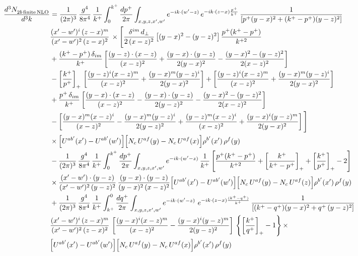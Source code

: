 \documentclass[10pt]{article}
\begin{document}
\begin{align}
    \frac{d^{3}N_{2b\,\rm finite\, NLO}^{\rm}}{d^{3}k} & = \frac{1}{(2\pi)^{3}}\,\frac{g^{4}}{8\pi^{4}}\,\frac{1}{k^{+}}\int_{0}^{k^{+}}\frac{dp^{+}}{2\pi}\int_{x,y,z,x',w'}e^{-ik\cdot(w'-z)}\,e^{-ik\cdot(z-x)\frac{p^{+}}{k^{+}}}\,\frac{1}{\left[p^{+}(y-x)^{2}+(k^{+}-p^{+})(y-z)^{2}\right]}\notag \\ & \frac{(x'-w')^{i}\,(z-x)^{m}}{(x'-w')^{2}\,(z-x)^{2}}\,\times\Bigg[\frac{\delta^{im}\,d_{\perp}}{2\,(x-z)^{2}}\left[(y-x)^{2}-(y-z)^{2}\right]\frac{p^{+}(k^{+}-p^{+})}{k^{+2}}
\notag \\ & +\frac{(k^{+}-p^{+})\,\delta_{im}}{k^{+}}\left[\frac{(y-z)\cdot(x-z)}{(x-z)^{2}}+\frac{(y-x)\cdot(y-z)}{2(y-x)^{2}}-\frac{(y-x)^{2}-(y-z)^{2}}{2(x-z)^{2}}\right]\notag\\
&-\left[\frac{k^{+}}{p^{+}}\right]_{+}\,\left[\frac{(y-z)^{i}(x-z)^{m}}{(x-z)^{2}}+\frac{(y-x)^{m}(y-z)^{i}}{2(y-x)^{2}}\right]+\left[\frac{(y-z)^{i}(x-z)^{m}}{(x-z)^{2}}+\frac{(y-x)^{m}(y-z)^{i}}{2(y-x)^{2}}\right]\notag\\
&+\frac{p^{+}\,\delta_{im}}{k^{+}}\left[\frac{(y-x)\cdot(x-z)}{(x-z)^{2}}-\frac{(y-x)\cdot(y-z)}{2(y-z)^{2}}-\frac{(y-x)^{2}-(y-z)^{2}}{2(x-z)^{2}}\right]\notag\\
&-\left[\frac{(y-x)^{m}(x-z)^{i}}{(x-z)^{2}}-\frac{(y-x)^{m}(y-z)^{i}}{2(y-z)^{2}}+\frac{(y-z)^{m}(x-z)^{i}}{(x-z)^{2}}+\frac{(y-x)^{i}(y-z)^{m}}{2(y-x)^{2}}\right]\Bigg]\notag\\
&\times\Big[U^{ab'}(x')-U^{ab'}(w')\Big]\Big[N_{c}\,U^{af}(y)-N_{c}\,U^{af}(x)\Big]\rho^{b'}(x')\,\rho^{f}(y)\notag \\
&-\frac{1}{(2\pi)^{3}}\,\frac{g^{4}}{8\pi^{4}}\,\frac{1}{k^{+}}\int_{0}^{k^{+}}\frac{dp^{+}}{2\pi}\int_{x,y,z,x',w'}e^{-ik\cdot(w'-z)}\,\frac{1}{k^{+}}\left[\frac{p^{+}(k^{+}-p^{+})}{k^{+2}}+\left[\frac{k^{+}}{k^{+}-p^{+}}\right]_{+}+\left[\frac{k^{+}}{p^{+}}\right]_{+}-2\right]\notag\\
&\times\frac{(x'-w')\cdot(y-z)}{(x'-w')^{2}\,(y-z)^{2}}\,\frac{(y-x)\cdot(y-z)}{(y-x)^{2}\,(x-z)^{2}}\Big[U^{ab'}(x')-U^{ab'}(w')\Big]\Big[N_{c}\,U^{af}(y)-N_{c}\,U^{af}(z)\Big]\rho^{b'}(x')\,\rho^{f}(y)\notag \\
& + \frac{1}{(2\pi)^{3}}\,\frac{g^{4}}{8\pi^{4}}\,\frac{1}{k^{+}}\int_{k^{+}}^{0}\frac{dq^{+}}{2\pi}\int_{x,y,z,x',w'}e^{-ik\cdot(w'-z)}\ e^{-ik\cdot(z-x)\frac{(k^{+}-q^{+})}{k^{+}}}\,\frac{1}{\left[(k^{+}-q^{+})(y-x)^{2}+q^{+}\,(y-z)^{2}\right]}\notag \\ & \frac{(x'-w')^{i}\,(z-x)^{m}}{(x'-w')^{2}\,(z-x)^{2}}\,\left[\frac{(y-x)^{i}(x-z)^{m}}{(x-z)^{2}}-\frac{(y-x)^{i}(y-z)^{m}}{2(y-z)^{2}}\right]\,\left\{\left[\frac{k^{+}}{q^{+}}\right]_{+}-1\right\}\times\notag \\ & \Big[U^{ab'}(x')-U^{ab'}(w')\Big]\Big[N_{c}\,U^{af}(y)-N_{c}\,U^{af}(x)\Big]\rho^{b'}(x')\,\rho^{f}(y)\notag \\

\end{align}
\end{document}
